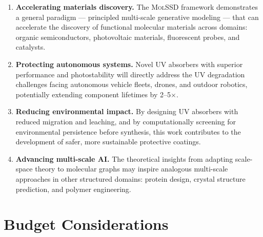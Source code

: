 \documentclass[11pt,a4paper]{article}
\newcommand{\molssd}{\textsc{MolSSD}}
\begin{document}
\begin{enumerate}[leftmargin=*]
  \item \textbf{Accelerating materials discovery.}
    The \molssd{} framework demonstrates a general paradigm --- principled multi-scale
    generative modeling --- that can accelerate the discovery of functional molecular
    materials across domains: organic semiconductors, photovoltaic materials,
    fluorescent probes, and catalysts.

  \item \textbf{Protecting autonomous systems.}
    Novel UV absorbers with superior performance and photostability will directly
    address the UV degradation challenges facing autonomous vehicle fleets, drones,
    and outdoor robotics, potentially extending component lifetimes by 2--5$\times$.

  \item \textbf{Reducing environmental impact.}
    By designing UV absorbers with reduced migration and leaching, and by
    computationally screening for environmental persistence before synthesis, this
    work contributes to the development of safer, more sustainable protective
    coatings.

  \item \textbf{Advancing multi-scale AI.}
    The theoretical insights from adapting scale-space theory to molecular graphs
    may inspire analogous multi-scale approaches in other structured domains:
    protein design, crystal structure prediction, and polymer engineering.
\end{enumerate}


\section{Budget Considerations}
\end{document}
